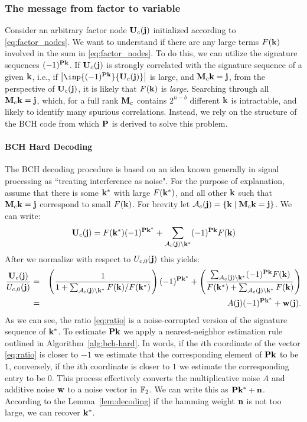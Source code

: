\subsubsection{The message from factor to variable} Consider an arbitrary factor node $\mathbf U_c(\mathbf j)$ initialized according to \eqref{eq:factor_nodes}. We want to understand if there are any large terms $F(\mathbf k)$ involved in the sum in \eqref{eq:factor_nodes}. To do this, we can utilize the signature sequences $(-1)^{\mathbf P \mathbf k}$. If $\mathbf U_c(\mathbf j)$ is strongly correlated with the signature sequence of a given $\mathbf k$, i.e., if $\abs{\inp{(-1)^{\bP \bk}}{\bU_c(\bj)}}$ is large, and $\mathbf M_c \mathbf k = \mathbf j$, from the perspective of $\mathbf U_c(\mathbf j)$, it is likely that $F(\mathbf k)$ is \emph{large}. Searching through all $\mathbf M_c \mathbf k = \mathbf j$, which, for a full rank $\mathbf M_c$ contains $2^{n-b}$ different $\mathbf k$ is intractable, and likely to identify many spurious correlations. Instead, we rely on the structure of the BCH code from which $\mathbf P$ is derived to solve this problem.

\paragraph{BCH Hard Decoding} The BCH decoding procedure is based on an idea known generally in signal processing as ``treating interference as noise". For the purpose of explanation, assume that there is some $\mathbf k^*$ with large $F(\mathbf k^*)$, and all other $\mathbf k$ such that $\mathbf M_c \mathbf k = \mathbf j$ correspond to small $F(\mathbf k)$. For brevity let $\mathcal A_c(\mathbf j) = \{\mathbf k\mid \mathbf M_c \mathbf k = \mathbf j\}$. We can write:
\begin{equation}
    \mathbf U_c(\mathbf j) = F(\mathbf k^*)(-1)^{\mathbf P \mathbf k^*} + \sum_{\mathcal A_c(\mathbf j) \setminus \mathbf k^*} (-1)^{\mathbf P \mathbf k} F(\mathbf k)
\end{equation}
After we normalize with respect to $U_{c,0}(\mathbf j)$ this yields:
\begin{eqnarray}
    \frac{\mathbf U_c(\mathbf j)}{U_{c,0}(\mathbf j)} &=& \left( \frac{1}{1 + \sum_{\mathcal A_c(\mathbf j) \setminus \mathbf k^*}F(\mathbf k)/F(\mathbf k^*)}\right)(-1)^{\mathbf P \mathbf k^*} + \left(\frac{\sum_{\mathcal A_c(\mathbf j) \setminus \mathbf k^*} (-1)^{\mathbf P \mathbf k}F(\mathbf k)}{F(\mathbf k^*) + \sum_{\mathcal A_c(\mathbf j) \setminus \mathbf k^*} F(\mathbf k)}\right) \\
    &=& A(\mathbf j) (-1)^{\mathbf P \mathbf k^*} + \mathbf w(\mathbf j). \label{eq:ratio}
\end{eqnarray}
As we can see, the ratio \eqref{eq:ratio} is a noise-corrupted version of the signature sequence of $\mathbf k^*$. To estimate $\mathbf P \mathbf k$ we apply a nearest-neighbor estimation rule outlined in Algorithm~\ref{alg:bch-hard}. In words, if the $i$th coordinate of the vector \eqref{eq:ratio} is closer to $-1$ we estimate that the corresponding element of $\mathbf P \mathbf k$ to be $1$, conversely, if the $i$th coordinate is closer to $1$ we estimate the corresponding entry to be $0$. This process effectively converts the multiplicative noise $A$ and additive noise $\mathbf w$ to a noise vector in $\mathbb F_2$. We can write this as $\mathbf P \mathbf k^{*} + \mathbf n$. According to the Lemma~\ref{lem:decoding} if the hamming weight $\mathbf n$ is not too large, we can recover $\mathbf k^*$. 

